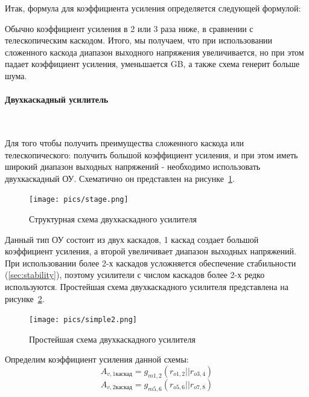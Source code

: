 \documentclass[a4paper,12pt,oneside]{scrartcl}
\begin{document}
Итак, формула для коэффициента усиления определяется следующей формулой:
\begin{figure}[!h]
\end{figure}

Обычно коэффициент усиления в 2 или 3 раза ниже, в сравнении с телескопическим каскодом. Итого, мы получаем, что при использовании сложенного каскода диапазон выходного напряжения увеличивается, но при этом падает коэффициент усиления, уменьшается GB, а также схема генерит больше шума.









\paragraph{Двухкаскадный усилитель}~~~~~~~~~~~~~~~~~~~~~~~~~~~~~

Для того чтобы получить преимущества сложенного каскода или телескопического: получить большой коэффициент усиления, и при этом иметь широкий диапазон выходных напряжений - необходимо использовать двухкаскадный ОУ. Схематично он представлен на рисунке~\ref{fig:stage}.

\begin{figure}[!htb]
\centering
\texttt{[image: pics/stage.png]}
\caption{Структурная схема двухкаскадного усилителя}
\label{fig:stage}
\end{figure}

Данный тип ОУ состоит из двух каскадов, 1 каскад создает большой коэффициент усиления, а второй увеличивает диапазон выходных напряжений. При использовании более 2-х каскадов усложняется обеспечение стабильности (\ref{sec:stability}), поэтому усилители с числом каскадов более 2-х редко используются. Простейшая схема двухкаскадного усилителя представлена на рисунке~\ref{fig:simple2}.

\begin{figure}[!htb]
\centering
\texttt{[image: pics/simple2.png]}
\caption{Простейшая схема двухкаскадного усилителя}
\label{fig:simple2}
\end{figure}

Определим коэффициент усиления данной схемы:
$$A_{v,1 каскад} = g_{m1,2} (r_{o1,2}  ||  r_{o3,4})$$
$$A_{v,2 каскад}= g_{m5,6} (r_{o5,6}  ||  r_{o7,8})$$
\end{document}
